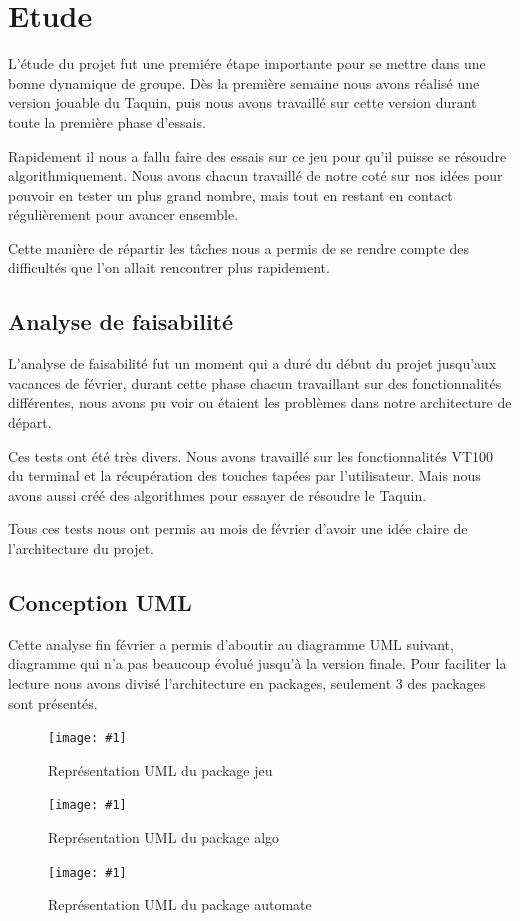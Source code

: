 ﻿\documentclass[a4paper,twoside,12pt]{report}
\newcommand{\monimage}[4]{
\par\noindent
\begin{figure}[H] %
\begin{center}
\texttt{[image: \#1]} %
\caption{#2} %
\label{#3} %
\end{center}
\end{figure} %
}
\newcommand{\ml}[0]{\par\noindent}
\begin{document}
\chapter{Etude}
\par
L'\'etude du projet fut une premi\'ere \'etape importante pour se mettre dans une 
bonne dynamique de groupe. D\`es la premi\`ere semaine nous avons r\'ealis\'e une 
version jouable du Taquin, puis nous avons travaill\'e sur cette version durant 
toute la premi\`ere phase d'essais.
\par\noindent
Rapidement il nous a fallu faire des essais sur ce jeu pour qu'il puisse se 
r\'esoudre algorithmiquement. Nous avons chacun travaill\'e de notre cot\'e sur nos 
id\'ees pour pouvoir en tester un plus grand nombre, mais tout en restant en 
contact r\'eguli\`erement pour avancer ensemble.
\par\noindent
Cette mani\`ere de r\'epartir les t\^aches nous a permis de se rendre compte des 
difficult\'es que l'on allait rencontrer plus rapidement.
%
\section{Analyse de faisabilit\'e}
\par
L'analyse de faisabilit\'e fut un moment qui a dur\'e du d\'ebut du projet jusqu'aux 
vacances de f\'evrier, durant cette phase chacun travaillant sur des 
fonctionnalit\'es diff\'erentes, nous avons pu voir ou \'etaient les probl\`emes dans 
notre architecture de d\'epart.
\par\noindent
Ces tests ont \'et\'e tr\`es divers. Nous avons travaill\'e sur les fonctionnalit\'es 
VT100 du terminal et la r\'ecup\'eration des touches tap\'ees par l'utilisateur. Mais 
nous avons aussi cr\'e\'e des algorithmes pour essayer de r\'esoudre le Taquin.
\par\noindent
Tous ces tests nous ont permis au mois de f\'evrier d'avoir une id\'ee claire de 
l'architecture du projet.
\section{Conception UML}
\par
Cette analyse fin f\'evrier a permis d'aboutir au diagramme UML suivant, diagramme 
qui n'a pas beaucoup \'evolu\'e jusqu'\`a la version finale. Pour
faciliter la lecture nous avons divis\'e l'architecture en packages, seulement 3 
des packages sont pr\'esent\'es.
\ml
\monimage{../dev/jeuPackage.png}{Repr\'esentation UML du package jeu}{JeuP}{0.9}
\ml
\monimage{../dev/algoPackage.png}{Repr\'esentation UML du package 
algo}{AlgoP}{0.9}
\ml
\monimage{../dev/automatePackage.png}{Repr\'esentation UML du package 
automate}{AutomateP}{0.3}
\end{document}
